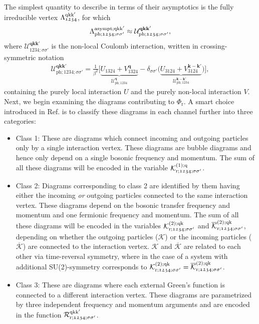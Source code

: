 \documentclass[../../main.tex]{subfiles}
\begin{document}
The simplest quantity to describe in terms of their asymptotics is the fully irreducible vertex $\Lambda^{\text{q}\text{k}\text{k}'}_{\mathfrak{1234}}$, for which
\begin{align}
	\Lambda^{\text{asympt};\text{q}\text{k}\text{k}'}_{\text{ph};\mathfrak{1234};\sigma\sigma'}\approx\mathcal{U}^{\textbf{qkk}'}_{\text{ph};\mathfrak{1234};\sigma\sigma'},
\end{align}
where $\mathcal{U}^{\textbf{qkk}'}_{\mathfrak{1234};\sigma\sigma'}$ is the non-local Coulomb interaction, written in crossing-symmetric notation
\begin{align}\label{eq:crossing_symmetric_uq}
	 \mathcal{U}^{\textbf{qkk}'}_{\text{ph};\mathfrak{1234};\sigma\sigma'}= \frac{1}{\beta^2}\Big [ \underbrace{U_{\mathfrak{1324}}+V^{\textbf{q}}_{\mathfrak{1324}}}_{\mathcal{U}^{\textbf{q}}_{\text{ph};\mathfrak{1234}}}-\delta_{\sigma\sigma'}\big (\underbrace{U_{\mathfrak{3124}}+V^{\textbf{k}-\textbf{k}'}_{\mathfrak{3124}}}_{\mathcal{U}^{\textbf{k}-\textbf{k}'}_{\text{ph};\mathfrak{1234}}}\big )\Big ],
\end{align}
containing the purely local interaction $U$ and the purely non-local interaction $V$. Next, we begin examining the diagrams contributing to $\Phi_{\text{r}}$. A smart choice introduced in Ref. \cite{high-freq asympt} is to classify these diagrams in each channel further into three categories:
\begin{itemize}
	\item Class 1: These are diagrams which connect incoming and outgoing particles only by a single interaction vertex. These diagrams are bubble diagrams and hence only depend on a single bosonic frequency and momentum. The sum of all these diagrams will be encoded in the variable $\mathcal{K}^{(1);\text{q}}_{\text{r};\mathfrak{1234};\sigma\sigma'}$.
	\item Class 2: Diagrams corresponding to class 2 are identified by them having either the incoming \textit{or} outgoing particles connected to the same interaction vertex. These diagrams depend on the bosonic transfer frequency and momentum and one fermionic frequency and momentum. The sum of all these diagrams will be encoded in the variables $\mathcal{K}^{(2);\text{q}\text{k}}_{\text{r};\mathfrak{1234};\sigma\sigma'}$ and $\overline{\mathcal{K}}^{(2);\text{q}\text{k}}_{\text{r};\mathfrak{1234};\sigma\sigma'}$, depending on whether the outgoing particles ($\mathcal{K}$) or the incoming particles ($\overline{\mathcal{K}}$) are connected to the interaction vertex. $\mathcal{K}$ and $\overline{\mathcal{K}}$ are related to each other via time-reversal symmetry, where in the case of a system with additional SU(2)-symmetry corresponds to \cite{rohringer thesis} $\mathcal{K}^{(2);\text{q}\text{k}}_{\text{r};\mathfrak{1234};\sigma\sigma'}=\overline{\mathcal{K}}^{(2);\text{q}\text{k}}_{\text{r};\mathfrak{1234};\sigma\sigma'}$.
	\item Class 3: These are diagrams where each external Green's function is connected to a different interaction vertex. These diagrams are parametrized by three independent frequency and momentum arguments and are encoded in the  function $\mathcal{R}^{\text{q}\text{k}\text{k}'}_{\text{r};\mathfrak{1234};\sigma\sigma'}$.
\end{itemize}
\end{document}
